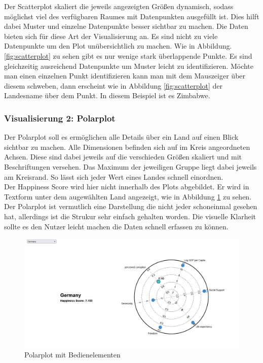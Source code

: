 Der Scatterplot skaliert die jeweils angezeigten Größen dynamisch, sodass möglichst viel des verfügbaren Raumes mit Datenpunkten ausgefüllt ist. Dies hilft dabei Muster und einzelne Datenpunkte besser sichtbar zu machen. Die Daten bieten sich für diese Art der Visualisierung an. Es sind nicht zu viele Datenpunkte um den Plot unübersichtlich zu machen. Wie in Abbildung.\ref{fig:scatterplot} zu sehen gibt es nur wenige stark überlappende Punkte. Es sind gleichzeitig ausreichend Datenpunkte um Muster leicht zu identifizieren. Möchte man einen einzelnen Punkt identifizieren kann man mit dem Mauszeiger über diesem schweben, dann erscheint wie in Abbildung \ref{fig:scatterplot} der Landesname über dem Punkt. In diesem Beispiel ist es Zimbabwe. 


\subsubsection{Visualisierung 2: Polarplot}

Der Polarplot soll es ermöglichen alle Details über ein Land auf einen Blick sichtbar zu machen. Alle Dimensionen befinden sich auf im Kreis angeordneten Achsen. Diese sind dabei jeweils auf die verschieden Größen skaliert und mit Beschriftungen versehen. Das Maximum der jeweiligen Gruppe liegt dabei jeweils am Kreisrand. So lässt sich jeder Wert eines Landes schnell einordnen. \\

Der Happiness Score wird hier nicht innerhalb des Plots abgebildet. Er wird in Textform unter dem augewählten Land angezeigt, wie in Abbildung \ref{fig:polarplot} zu sehen. Der Polarplot ist vermutlich eine Darstellung die nicht jeder schoneinmal gesehen hat, allerdings ist die Strukur sehr einfach gehalten worden. Die visuelle Klarheit sollte es den Nutzer leicht machen die Daten schnell erfassen zu können. \\

\begin{figure}[h]
 \centering
 \includegraphics[width = \textwidth]{img/polarplot.jpg}
 \caption{Polarplot mit Bedienelementen}
 \label{fig:polarplot}
\end{figure}


